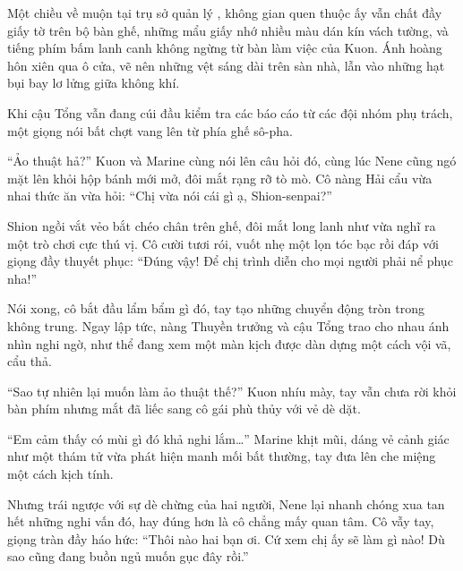 \documentclass[../main.tex]{subfiles}
\begin{document}

Một chiều về muộn tại trụ sở quản lý \hll, không gian quen thuộc ấy vẫn chất đầy giấy tờ trên bộ bàn ghế, những mẩu giấy nhớ nhiều màu dán kín vách tường, và tiếng phím bấm lanh canh không ngừng từ bàn làm việc của Kuon. Ánh hoàng hôn xiên qua ô cửa, vẽ nên những vệt sáng dài trên sàn nhà, lẫn vào những hạt bụi bay lơ lửng giữa không khí.

Khi cậu Tổng vẫn đang cúi đầu kiểm tra các báo cáo từ các đội nhóm phụ trách, một giọng nói bất chợt vang lên từ phía ghế sô-pha.

``Ảo thuật hả?'' Kuon và Marine cùng nói lên câu hỏi đó, cùng lúc Nene cũng ngó mặt lên khỏi hộp bánh mới mở, đôi mắt rạng rỡ tò mò. Cô nàng Hải cẩu vừa nhai thức ăn vừa hỏi: ``Chị vừa nói cái gì ạ, Shion-senpai?''

Shion ngồi vắt vẻo bắt chéo chân trên ghế, đôi mắt long lanh như vừa nghĩ ra một trò chơi cực thú vị. Cô cười tươi rói, vuốt nhẹ một lọn tóc bạc rồi đáp với giọng đầy thuyết phục: ``Đúng vậy! Để chị trình diễn cho mọi người phải nể phục nha!''

Nói xong, cô bắt đầu lẩm bẩm gì đó, tay tạo những chuyển động tròn trong không trung. Ngay lập tức, nàng Thuyền trưởng và cậu Tổng trao cho nhau ánh nhìn nghi ngờ, như thể đang xem một màn kịch được dàn dựng một cách vội vã, cẩu thả.

``Sao tự nhiên lại muốn làm ảo thuật thế?'' Kuon nhíu mày, tay vẫn chưa rời khỏi bàn phím nhưng mắt đã liếc sang cô gái phù thủy với vẻ dè dặt.

``Em cảm thấy có mùi gì đó khả nghi lắm\dots'' Marine khịt mũi, dáng vẻ cảnh giác như một thám tử vừa phát hiện manh mối bất thường, tay đưa lên che miệng một cách kịch tính.

Nhưng trái ngược với sự dè chừng của hai người, Nene lại nhanh chóng xua tan hết những nghi vấn đó, hay đúng hơn là cô chẳng mấy quan tâm. Cô vẫy tay, giọng tràn đầy háo hức: ``Thôi nào hai bạn ơi. Cứ xem chị ấy sẽ làm gì nào! Dù sao cũng đang buồn ngủ muốn gục đây rồi.''
\end{document}
